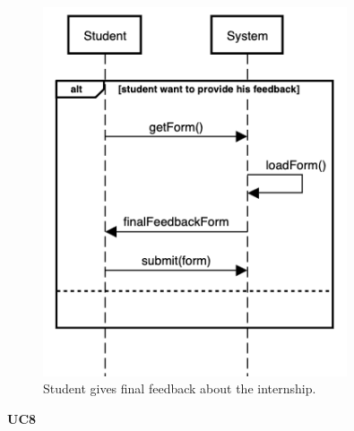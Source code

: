     \begin{figure}[H]
        \centering
        \includegraphics[width=0.8\textwidth]{RASD/Assets/SequenceDiagrams/7-internship-final-form.png}
        \caption{Student gives final feedback about the internship.}
        \label{fig:Student gives final feedback about the internship}
    \end{figure}


    \textbf{UC8}
    

